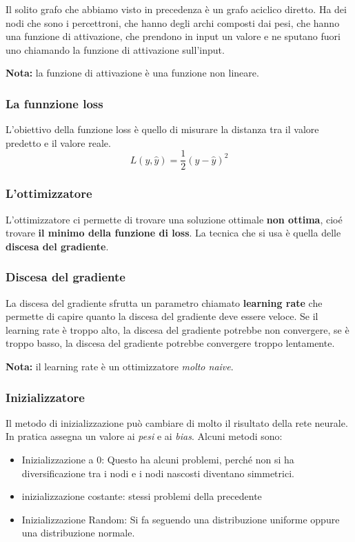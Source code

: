 Il solito grafo che abbiamo visto in precedenza è un grafo aciclico diretto. Ha
dei nodi che sono i percettroni, che hanno degli archi composti dai pesi, che
hanno una funzione di attivazione, che prendono in input un valore e ne sputano
fuori uno chiamando la funzione di attivazione sull'input.

\textbf{Nota:} la funzione di attivazione è una funzione non lineare.

\subsubsection{La funnzione loss}

L'obiettivo della funzione loss è quello di misurare la distanza tra il valore
predetto e il valore reale.
\begin{equation}
    L(y,\hat{y}) = \frac{1}{2}(y-\hat{y})^2
\end{equation}

\subsubsection{L'ottimizzatore}

L'ottimizzatore ci permette di trovare una soluzione ottimale \textbf{non
    ottima}, cioé trovare \textbf{il minimo della funzione di loss}. La tecnica che
si usa è quella delle \textbf{discesa del gradiente}.

\subsubsection{Discesa del gradiente}

La discesa del gradiente sfrutta un parametro chiamato \textbf{learning rate}
che permette di capire quanto la discesa del gradiente deve essere veloce. Se
il learning rate è troppo alto, la discesa del gradiente potrebbe non
convergere, se è troppo basso, la discesa del gradiente potrebbe convergere
troppo lentamente.

\textbf{Nota:} il learning rate è un ottimizzatore \textit{molto naive}.

\subsubsection{Inizializzatore}

Il metodo di inizializzazione può cambiare di molto il risultato della rete
neurale. In pratica assegna un valore ai \textit{pesi} e ai \textit{bias}.
Alcuni metodi sono:
\begin{itemize}
    \item Inizializzazione a 0: Questo ha alcuni problemi, perché non si ha
          diversificazione tra i nodi e i nodi nascosti diventano simmetrici.
    \item inizializzazione costante: stessi problemi della precedente
    \item Inizializzazione Random: Si fa seguendo una distribuzione uniforme oppure una
          distribuzione normale.
\end{itemize}

